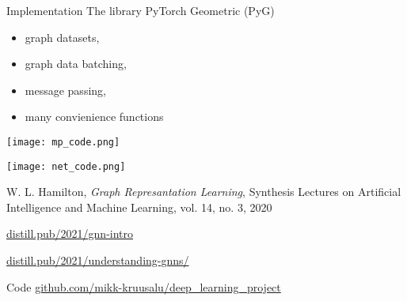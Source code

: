 \documentclass{beamer}
\begin{document}
\begin{frame}{Implementation}
    The library PyTorch Geometric (PyG)
    \begin{itemize}
        \item graph datasets,
        \item graph data batching,
        \item message passing,
        \item many convienience functions
    \end{itemize}
\end{frame}

\begin{frame}[plain]
    \texttt{[image: mp\_code.png]}
\end{frame}

\begin{frame}[plain]
    \texttt{[image: net\_code.png]}
\end{frame}

\begin{frame}
    W. L. Hamilton, \textit{Graph Represantation Learning}, Synthesis Lectures on Artificial Intelligence and Machine Learning, vol. 14, no. 3, 2020

    \url{distill.pub/2021/gnn-intro}

    \url{distill.pub/2021/understanding-gnns/}

    \vfill
    Code \url{github.com/mikk-kruusalu/deep_learning_project}
\end{frame}
\end{document}
